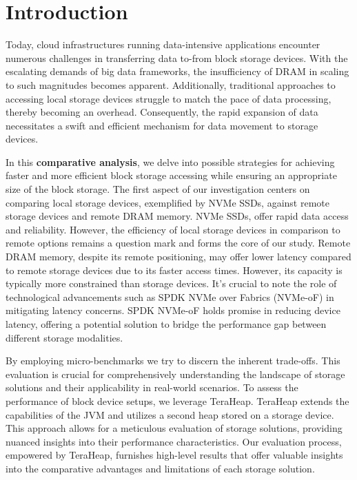 \section{Introduction}
Today, cloud infrastructures running data-intensive applications encounter numerous challenges in transferring data to-from block storage devices. With the escalating demands of big data frameworks, the insufficiency of DRAM in scaling to such magnitudes becomes apparent. Additionally, traditional approaches to accessing local storage devices struggle to match the pace of data processing, thereby becoming an overhead. Consequently, the rapid expansion of data necessitates a swift and efficient mechanism for data movement to storage devices. 

In this \textbf{comparative analysis}, we delve into possible strategies for achieving faster and more efficient block storage accessing while ensuring an appropriate size of the block storage. The first aspect of our investigation centers on comparing local storage devices, exemplified by NVMe SSDs, against remote storage devices and remote DRAM memory. NVMe SSDs, offer rapid data access and reliability. However, the efficiency of local storage devices in comparison to remote options remains a question mark and forms the core of our study. Remote DRAM memory, despite its remote positioning, may offer lower latency compared to remote storage devices due to its faster access times. However, its capacity is typically more constrained than storage devices. It's crucial to note the role of technological advancements such as SPDK NVMe over Fabrics (NVMe-oF) in mitigating latency concerns. SPDK NVMe-oF holds promise in reducing device latency, offering a potential solution to bridge the performance gap between different storage modalities. 

By employing micro-benchmarks we try to discern the inherent trade-offs. This evaluation is crucial for comprehensively understanding the landscape of storage solutions and their applicability in real-world scenarios. To assess the performance of block device setups, we leverage TeraHeap. TeraHeap extends the capabilities of the JVM and utilizes a second heap stored on a storage device. This approach allows for a meticulous evaluation of storage solutions, providing nuanced insights into their performance characteristics. Our evaluation process, empowered by TeraHeap, furnishes high-level results that offer valuable insights into the comparative advantages and limitations of each storage solution.

